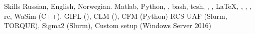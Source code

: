 
\begin{rubric}{Skills}
\entry*[Languages]
	Russian, English, Norwegian.
	Matlab, Python,  , bash, tcsh, ,   , \LaTeX, , , , rc,
 \entry*[Models]
	WaSim (C++), GIPL (), CLM (), CFM (Python)
 \entry*[HPC]
        RCS UAF (Slurm, TORQUE), Sigma2 (Slurm), Custom setup (Windows Server 2016)

\end{rubric}